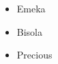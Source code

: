 \documentclass{article}
\begin{document}
	
	\begin{itemize}
		\item Emeka
		\item Bisola
		\item Precious
	\end{itemize}
\end{document}
